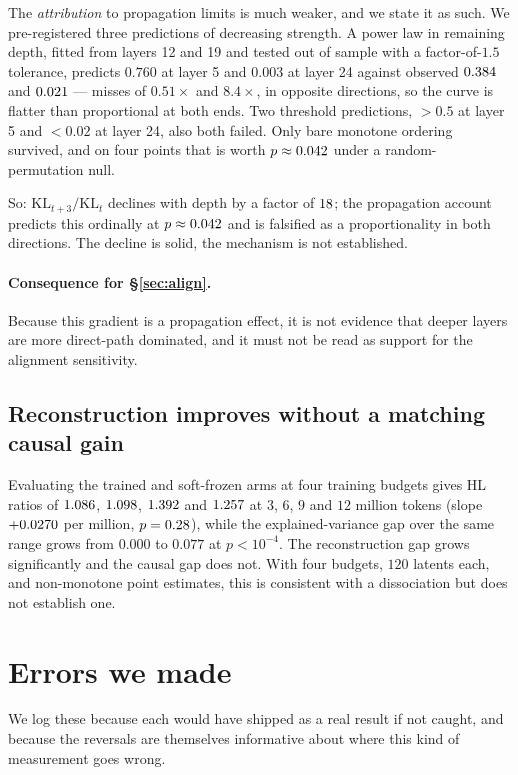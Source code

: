 \documentclass[11pt]{article}
\begin{document}
The \emph{attribution} to propagation limits is much weaker, and we state it as
such. We pre-registered three predictions of decreasing strength. A power law in
remaining depth, fitted from layers 12 and 19 and tested out of sample with a
factor-of-$1.5$ tolerance, predicts $0.760$ at layer 5 and $0.003$ at layer 24
against observed $0.384$ and $0.021$ --- misses of
$0.51\times$ and $8.4\times$, in opposite directions, so the curve is flatter than
proportional at both ends. Two threshold predictions, $>\!0.5$ at layer 5 and
$<\!0.02$ at layer 24, also both failed. Only bare monotone ordering survived, and
on four points that is worth $p\approx0.042$ under a random-permutation
null.

So: $\mathrm{KL}_{t+3}/\mathrm{KL}_t$ declines with depth by a factor of
$18$; the propagation account predicts this ordinally at
$p\approx0.042$ and is falsified as a proportionality in both directions.
The decline is solid, the mechanism is not established.

\paragraph{Consequence for \S\ref{sec:align}.} Because this gradient is a
propagation effect, it is not evidence that deeper layers are more direct-path
dominated, and it must not be read as support for the alignment sensitivity.

\subsection{Reconstruction improves without a matching causal gain}
Evaluating the trained and soft-frozen arms at four training budgets gives HL
ratios of $1.086$, $1.098$, $1.392$ and $1.257$ at $3$, $6$,
$9$ and $12$ million tokens (slope $+0.0270$ per million, $p=0.28$),
while the explained-variance gap over the same range grows from $0.000$ to
$0.077$ at $p<10^{-4}$. The reconstruction gap grows significantly and the causal
gap does not. With four budgets, $120$ latents each, and non-monotone point
estimates, this is consistent with a dissociation but does not establish one.

\section{Errors we made}
\label{sec:errors}
We log these because each would have shipped as a real result if not caught, and
because the reversals are themselves informative about where this kind of
measurement goes wrong.
\end{document}
